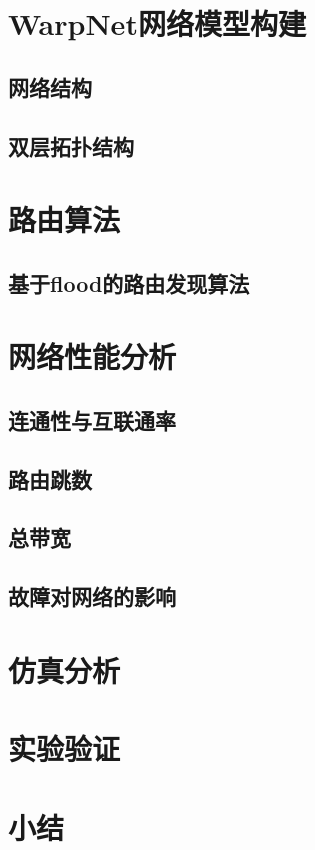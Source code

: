 \section{WarpNet网络模型构建}\label{sec:warpnet_construction}
\subsection{网络结构}
\Blindtext
\subsection{双层拓扑结构}
\Blindtext
\section{路由算法}
\subsection{基于flood的路由发现算法}
\Blindtext
\section{网络性能分析}
\blindtext
\subsection{连通性与互联通率}
\Blindtext
\subsection{路由跳数}
\Blindtext
\subsection{总带宽}
\Blindtext
\subsection{故障对网络的影响}
\Blindtext
\section{仿真分析}
\Blindtext
\section{实验验证}
\Blindtext
\section{小结}
\blindtext